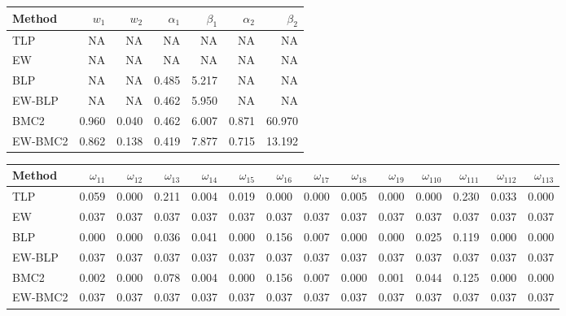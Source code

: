 \documentclass[
]{article}
\begin{document}
\begin{tabular}{lrrrrrr}
\toprule
Method & $w_1$ & $w_2$ & $\alpha_1$ & $\beta_1$ & $\alpha_2$ & $\beta_2$\\
\midrule
TLP & NA & NA & NA & NA & NA & NA\\
EW & NA & NA & NA & NA & NA & NA\\
BLP & NA & NA & 0.485 & 5.217 & NA & NA\\
EW-BLP & NA & NA & 0.462 & 5.950 & NA & NA\\
BMC2 & 0.960 & 0.040 & 0.462 & 6.007 & 0.871 & 60.970\\
EW-BMC2 & 0.862 & 0.138 & 0.419 & 7.877 & 0.715 & 13.192\\
\bottomrule
\end{tabular}

\begin{tabular}{lrrrrrrrrrrrrr}
\toprule
Method & $\omega_{11}$ & $\omega_{12}$ & $\omega_{13}$ & $\omega_{14}$ & $\omega_{15}$ & $\omega_{16}$ & $\omega_{17}$ & $\omega_{18}$ & $\omega_{19}$ & $\omega_{110}$ & $\omega_{111}$ & $\omega_{112}$ & $\omega_{113}$\\
\midrule
TLP & 0.059 & 0.000 & 0.211 & 0.004 & 0.019 & 0.000 & 0.000 & 0.005 & 0.000 & 0.000 & 0.230 & 0.033 & 0.000\\
EW & 0.037 & 0.037 & 0.037 & 0.037 & 0.037 & 0.037 & 0.037 & 0.037 & 0.037 & 0.037 & 0.037 & 0.037 & 0.037\\
BLP & 0.000 & 0.000 & 0.036 & 0.041 & 0.000 & 0.156 & 0.007 & 0.000 & 0.000 & 0.025 & 0.119 & 0.000 & 0.000\\
EW-BLP & 0.037 & 0.037 & 0.037 & 0.037 & 0.037 & 0.037 & 0.037 & 0.037 & 0.037 & 0.037 & 0.037 & 0.037 & 0.037\\
BMC2 & 0.002 & 0.000 & 0.078 & 0.004 & 0.000 & 0.156 & 0.007 & 0.000 & 0.001 & 0.044 & 0.125 & 0.000 & 0.000\\
EW-BMC2 & 0.037 & 0.037 & 0.037 & 0.037 & 0.037 & 0.037 & 0.037 & 0.037 & 0.037 & 0.037 & 0.037 & 0.037 & 0.037\\
\bottomrule
\end{tabular}
\end{document}
